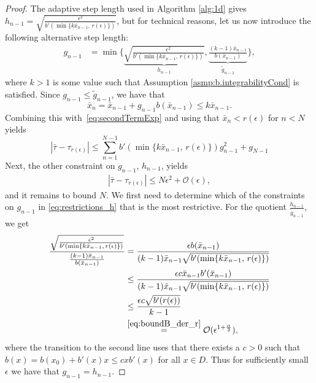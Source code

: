 \documentclass[10pt,a4paper]{amsart}
\newcommand{\abs}[1]{\left\lvert#1\right\rvert}
\begin{document}
\begin{proof}
    The adaptive step length used in Algorithm \ref{alg:1d} gives \(h_{n-1} = \sqrt{\frac{\epsilon^2}{b'(\min\{k\bar x_{n-1},\,r(\epsilon)\})}}\), but for technical reasons, let us now introduce the following alternative step length:
    \begin{align}
        \label{eq:restrictions_h}
        g_{n-1} &= \min\Bigg\{ \underbrace{\sqrt{\frac{\epsilon^2}{b'(\min\{k\bar x_{n-1},\,r(\epsilon)\})}}}_{h_{n-1}}, \underbrace{\frac{(k-1)\bar x_{n-1}}{b(\bar x_{n-1})}}_{\tilde g_{n-1}} \Bigg\},
    \end{align}
    where \(k > 1\) is some value such that Assumption \ref{asmp:b.integrabilityCond} is satisfied. 
    Since \(g_{n-1} \leq \tilde g_{n-1}\), we have that
    \[\bar x_n = \bar x_{n-1} + g_{n-1}b(\bar x_{n-1}) \leq k\bar x_{n-1}.\] 
    Combining this with~\eqref{eq:secondTermExp} 
    and using that \(\bar x_{n} < r(\epsilon)\) for \(n < N\) yields
    \[\abs{\bar\tau-\tau_{r(\epsilon)}} \leq \sum_{n=1}^{N-1}b'(\min\{k\bar x_{n-1},\, r(\epsilon)\})g_{n-1}^2 + g_{N-1}\]
    Next, the other constraint on \(g_{n-1}\), \(h_{n-1}\), yields
    \begin{align}
        \label{eq:secondErrorTermFinal}
        \abs{\bar\tau-\tau_{r(\epsilon)}} \leq N\epsilon^2 + \mathcal{O}(\epsilon),
    \end{align}
    and it remains to bound \(N\). We first need to determine which of the constraints on \(g_{n-1}\) in \eqref{eq:restrictions_h} that is the most restrictive. For the quotient \(\frac{h_{n-1}}{\tilde g_{n-1}}\), we get
    \begin{align*}
        \frac{\sqrt{\frac{\epsilon^2}{b'(\min\{k\bar x_{n-1},\, r(\epsilon)\})}}}{\frac{(k-1)\bar x_{n-1}}{b(\bar x_{n-1})}} &= \frac{\epsilon b(\bar x_{n-1})}{(k-1)\bar x_{n-1}\sqrt{b'(\min\{k\bar x_{n-1},\, r(\epsilon)\})}} \\
        &\leq \frac{\epsilon c\bar x_{n-1} b'(\bar x_{n-1})}{(k-1)\bar x_{n-1}\sqrt{b'(\min\{k\bar x_{n-1},\, r(\epsilon)\})}} \\
        &\leq \frac{\epsilon c \sqrt{b'(r(\epsilon))}}{k-1} \\
        &\overset{\eqref{eq:boundB_der_r}}{=} \mathcal{O}(\epsilon^{1+\frac{\alpha}{2}}),
    \end{align*}
    where the transition to the second line uses that there exists a \(c>0\) such that \(b(x) = b(x_0) + b'(x)x \leq cxb'(x)\) for all \(x \in D\). 
    Thus for sufficiently small \(\epsilon\) we have that \(g_{n-1} = h_{n-1}\).


\end{proof}
\end{document}
